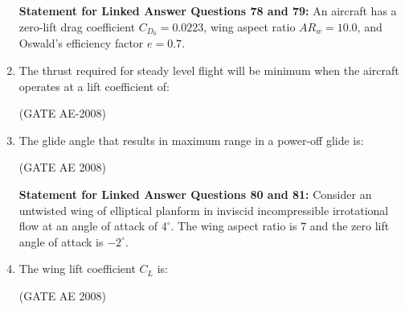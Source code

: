 \documentclass[journal,12pt,onecolumn]{IEEEtran}
\theoremstyle{remark}
\begin{document}
\begin{enumerate}
\quad 

\textbf{Statement for Linked Answer Questions 78 and 79:}  
An aircraft has a zero-lift drag coefficient $C_{D_0} = 0.0223$, wing aspect ratio $AR_w = 10.0$, and Oswald's efficiency factor $e = 0.7$.

\item The thrust required for steady level flight will be minimum when the aircraft operates at a lift coefficient of:  

\begin{enumerate}
\end{enumerate}
\hfill(GATE AE-2008)

\quad 

\item The glide angle that results in maximum range in a power-off glide is:  

\begin{enumerate}
\end{enumerate}
\hfill(GATE AE 2008)

\quad 

\textbf{Statement for Linked Answer Questions 80 and 81:}  
Consider an untwisted wing of elliptical planform in inviscid incompressible irrotational flow at an angle of attack of $4^\circ$.  
The wing aspect ratio is $7$ and the zero lift angle of attack is $-2^\circ$.\\

\item The wing lift coefficient $C_L$ is:  

\begin{enumerate}
\end{enumerate}
\hfill(GATE AE 2008)


\end{enumerate}
\end{document}
